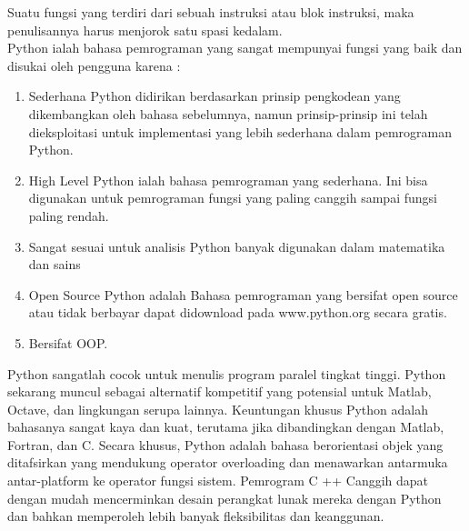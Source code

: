 \documentclass[12pt,a4paper]{article}
\begin{document}
Suatu fungsi yang terdiri dari sebuah instruksi atau blok instruksi, maka penulisannya harus menjorok satu spasi kedalam. \\


Python ialah bahasa pemrograman yang sangat mempunyai fungsi yang baik dan disukai oleh pengguna karena :
\begin{enumerate}

\item Sederhana
Python didirikan berdasarkan prinsip pengkodean yang dikembangkan oleh bahasa sebelumnya, namun prinsip-prinsip ini telah dieksploitasi untuk implementasi yang lebih sederhana dalam pemrograman Python.

\item High Level
Python ialah bahasa pemrograman yang sederhana. Ini bisa digunakan untuk pemrograman fungsi yang paling canggih sampai fungsi paling rendah.

\item Sangat sesuai untuk analisis
 Python banyak digunakan dalam matematika dan sains
 
\item Open Source
Python adalah Bahasa pemrograman yang bersifat open source atau tidak berbayar dapat didownload pada www.python.org secara gratis.\\

\item Bersifat OOP.

\end{enumerate}

Python sangatlah cocok untuk menulis program paralel tingkat tinggi. Python sekarang muncul sebagai alternatif kompetitif yang potensial untuk Matlab, Octave, dan lingkungan serupa lainnya. Keuntungan khusus Python adalah bahasanya sangat kaya dan kuat, terutama jika dibandingkan dengan Matlab, Fortran, dan C. Secara khusus, Python adalah bahasa berorientasi objek yang ditafsirkan yang mendukung operator overloading dan menawarkan antarmuka antar-platform ke operator fungsi sistem. Pemrogram C ++ Canggih dapat dengan mudah mencerminkan desain perangkat lunak mereka dengan Python dan bahkan memperoleh lebih banyak fleksibilitas dan keanggunan.\\
\end{document}
